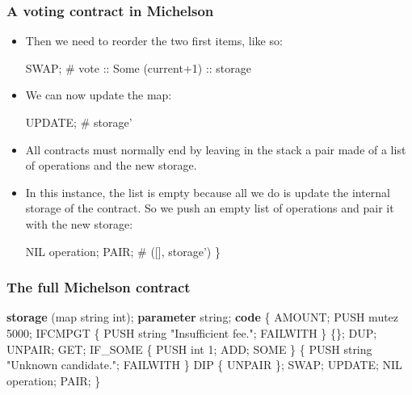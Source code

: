 \documentclass[compress,dvips,xcolor={dvipsnames},t]{beamer}
\begin{document}
\begin{frame}[containsverbatim]
  \frametitle{A voting contract in Michelson}

  \begin{itemize}

    \item Then we need to reorder the two first items, like so:
\begin{semiverbatim}
SWAP;
# vote :: Some (current+1) :: storage
\end{semiverbatim}

    \item We can now update the map:
\begin{semiverbatim}
UPDATE;
# storage'
\end{semiverbatim}

    \item All contracts must normally end by leaving in the stack a
      pair made of a list of operations and the new storage.

    \item In this instance, the list is empty because all we do is
      update the internal storage of the contract. So we push an empty
      list of operations and pair it with the new storage:
\begin{semiverbatim}
NIL operation;
PAIR;
# ([], storage')
\}
\end{semiverbatim}

  \end{itemize}

\end{frame}

\begin{frame}[containsverbatim]
  \frametitle{The full Michelson contract}
  \begin{semiverbatim}
    \small
\textbf{storage} (map string int);
\textbf{parameter} string;
\textbf{code} \{
 AMOUNT;
 PUSH mutez 5000;
 IFCMPGT \{ PUSH string "Insufficient fee."; FAILWITH \} \{\};
 DUP;
 UNPAIR;
 GET;
 IF\_SOME \{ PUSH int 1; ADD; SOME \}
         \{ PUSH string "Unknown candidate."; FAILWITH \}
 DIP \{ UNPAIR \};
 SWAP;
 UPDATE;
 NIL operation;
 PAIR;
\}
\end{semiverbatim}

\end{frame}
\end{document}
